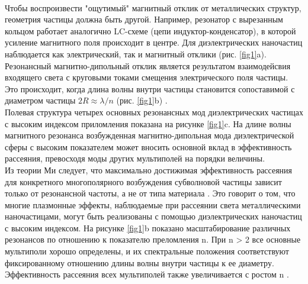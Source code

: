 \\
\hspace*{2mm}
Чтобы воспроизвести "ощутимый" магнитный отклик от металлических структур, геометрия частицы должна быть другой. Например, резонатор с вырезанным кольцом \cite{pendry1999magnetism} работает аналогично LC-схеме (цепи индуктор-конденсатор), в которой усиление магнитного поля происходит в центре. Для диэлектрических наночастиц наблюдается как электрический, так и магнитный отклики (рис. \ref{fig1}a). Резонансный магнитно-дипольный отклик является результатом взаимодейсвия входящего света с круговыми токами смещения электрического поля частицы. Это происходит, когда длина волны внутри частицы становится сопоставимой с диаметром частицы $2R \approx \lambda/n$ (рис. \ref{fig1}b) \cite{kuznetsov2016optically}. 
\\
\hspace*{2mm}
Полевая структура четырех основных резонансных мод диэлектрических частицах с высоким индексом приломления показана на рисунке \ref{fig1}c. На длине волны магнитного резонанса возбужденная магнитно-дипольная мода диэлектрической сферы с высоким показателем может вносить основной вклад в эффективность рассеяния, превосходя моды других мультиполей на порядки величины.
\\
\hspace*{2mm}
Из теории Ми следует, что максимально достижимая эффективность рассеяния для конкретного многополярного возбуждения субволновой частицы зависит только от резонансной частоты, а не от типа материала \cite{schuller2009general}. Это говорит о том, что многие плазмонные эффекты, наблюдаемые при рассеянии света металлическими наночастицами, могут быть реализованы с помощью диэлектрических наночастиц с высоким индексом. На рисунке \ref{fig1}b показано масштабирование различных резонансов по отношению к показателю преломления n. При n > 2 все основные мультиполи хорошо определены, и их спектральные положения соответствуют фиксированному отношению длины волны внутри частицы к ее диаметру. Эффективность рассеяния всех мультиполей также увеличивается с ростом n \cite{articleOptSi}.

